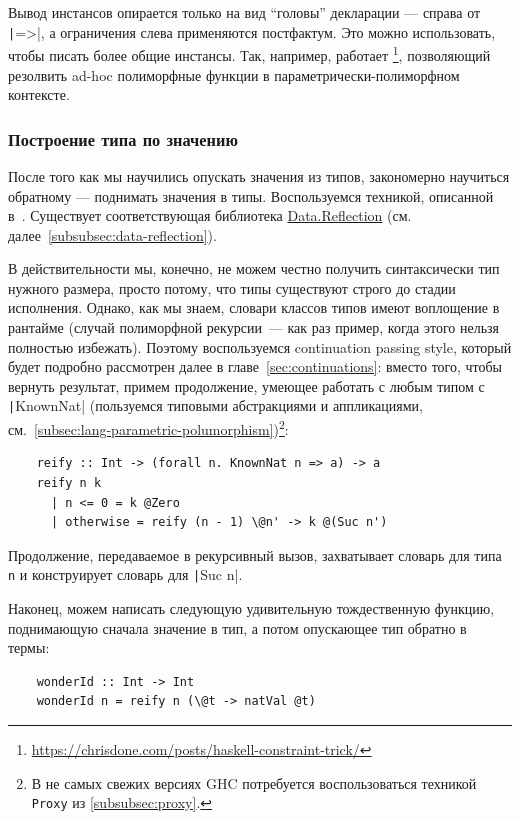 Вывод инстансов опирается только на вид ``головы'' декларации --- справа от \texttt|=>|, а ограничения слева применяются постфактум.
Это можно использовать, чтобы писать более общие инстансы.
Так, например, работает \footnote{\url{https://chrisdone.com/posts/haskell-constraint-trick/}}, позволяющий резолвить ad-hoc полиморфные функции в параметрически-полиморфном контексте.

\subsubsection{Построение типа по значению} \label{subsubsec:reify}

После того как мы научились опускать значения из типов, закономерно научиться обратному --- поднимать значения в типы.
Воспользуемся техникой, описанной в~\cite{kiselyov2004functional}.
Существует соответствующая библиотека \href{https://hackage.haskell.org/package/reflection-2.1.6/docs/Data-Reflection.html}{Data.Reflection} (см. далее\ \ref{subsubsec:data-reflection}).

В действительности мы, конечно, не можем честно получить синтаксически тип нужного размера, просто потому, что типы существуют строго до стадии исполнения.
Однако, как мы знаем, словари классов типов имеют воплощение в рантайме (случай полиморфной рекурсии~--- как раз пример, когда этого нельзя полностью избежать).
Поэтому воспользуемся continuation passing style, который будет подробно рассмотрен далее в главе~\ref{sec:continuations}: вместо того, чтобы вернуть результат, примем продолжение, умеющее работать с любым типом с \texttt|KnownNat| (пользуемся типовыми абстракциями и аппликациями, см.\ \ref{subsec:lang-parametric-polumorphism})\footnote{В не самых свежих версиях GHC потребуется воспользоваться техникой \texttt{Proxy} из \ref{subsubsec:proxy}.}:
\begin{verbatim}
    reify :: Int -> (forall n. KnownNat n => a) -> a
    reify n k
      | n <= 0 = k @Zero
      | otherwise = reify (n - 1) \@n' -> k @(Suc n')
\end{verbatim}

Продолжение, передаваемое в рекурсивный вызов, захватывает словарь для типа \texttt{n} и конструирует словарь для \texttt|Suc n|.

Наконец, можем написать следующую удивительную тождественную функцию, поднимающую сначала значение в тип, а потом опускающее тип обратно в термы:
\begin{verbatim}
    wonderId :: Int -> Int
    wonderId n = reify n (\@t -> natVal @t)
\end{verbatim}

